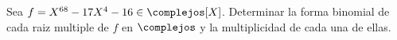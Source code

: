 \begin{enunciado}{\ejercicio}
	Sea $f = X^{68} - 17X^4 - 16 \in \complejos[X]$. Determinar la forma binomial de cada raiz multiple
    de $f$ en $\complejos$ y la multiplicidad de cada una de ellas. 
\end{enunciado}

\hacer
